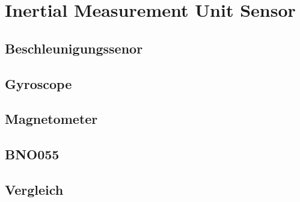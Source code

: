 \chapter{Inertial Measurement Unit Sensor}

\section{Beschleunigungssenor}

\section{Gyroscope}

\section{Magnetometer}


\section{BNO055}

\section{Vergleich}
